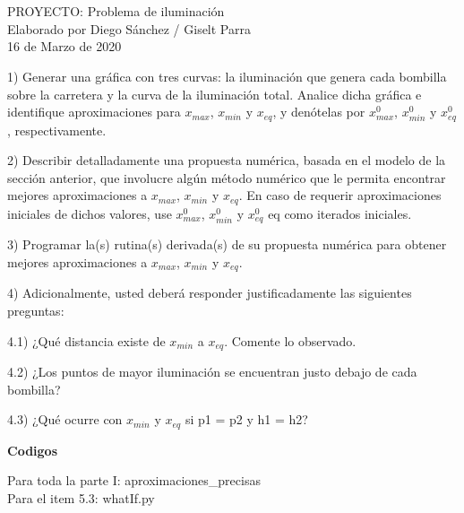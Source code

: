 \documentclass[11pt]{article}
\begin{document}
\begin{center}
 \Large{\\ \\PROYECTO: Problema de iluminación} \\ \medskip
 \small{Elaborado por Diego Sánchez / Giselt Parra}\\ \medskip
 \footnotesize{16 de Marzo de 2020}
\end{center}

\begin{tcolorbox}[enhanced jigsaw,breakable,pad at break*=1mm, title= Puntos extremos de iluminación]

\vspace{0.25cm}
1) Generar una gráfica con tres curvas: la iluminación que genera cada bombilla sobre la
carretera y la curva de la iluminación total. Analice dicha gráfica e identifique aproximaciones para $x_{max}$, $x_{min}$ y $x_{eq}$, y denótelas por $x^0_{max}$, $x^0_{min}$ y $x^0_{eq}$, respectivamente.

\vspace{0.5cm}
2) Describir detalladamente una propuesta numérica, basada en el modelo de la sección
anterior, que involucre algún método numérico que le permita encontrar mejores aproximaciones a $x_{max}$, $x_{min}$ y $x_{eq}$. En caso de requerir aproximaciones iniciales de dichos
valores, use $x^0_{max}$, $x^0_{min}$ y $x^0_{eq}$
eq como iterados iniciales.

\vspace{0.5cm}
3) Programar la(s) rutina(s) derivada(s) de su propuesta numérica para obtener mejores aproximaciones a $x_{max}$, $x_{min}$ y $x_{eq}$.

\vspace{0.5cm}
4) Adicionalmente, usted deberá responder justificadamente las siguientes preguntas:

\vspace{0.25cm} \hspace{0.25cm}
4.1) ¿Qué distancia existe de $x_{min}$ a $x_{eq}$. Comente lo observado.

\vspace{0.25cm} \hspace{0.25cm}
4.2) ¿Los puntos de mayor iluminación se encuentran justo debajo de cada bombilla?

\vspace{0.25cm} \hspace{0.25cm}
4.3) ¿Qué ocurre con $x_{min}$ y $x_{eq}$ si p1 = p2 y h1 = h2?

\end{tcolorbox}
\noindent \textbf{Codigos}
\begin{tcolorbox}[colframe=blue!35!black, title=Códigos pregunta 3]
    Para toda la parte I: 
    aproximaciones\_precisas 
     \\
     Para el item 5.3:
    whatIf.py 
\end{tcolorbox}
\end{document}
